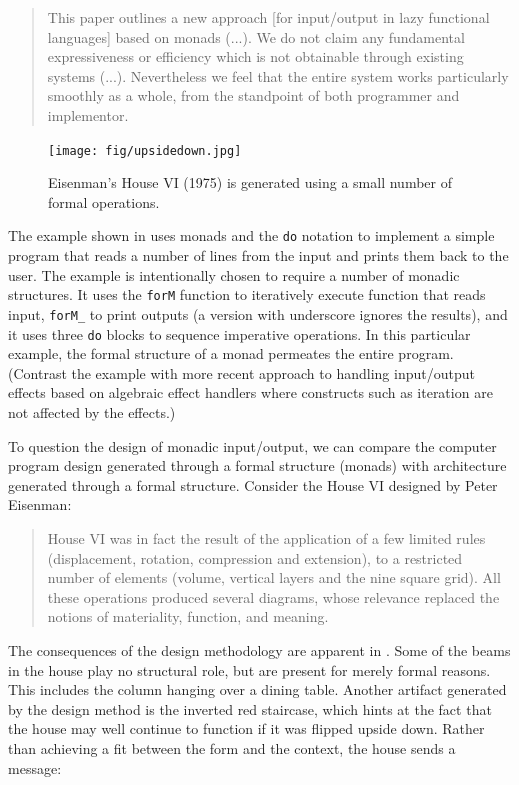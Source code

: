 \begin{quote}
This paper outlines a new approach [for input/output in lazy functional languages]
based on monads (...). We do not claim any fundamental expressiveness or efficiency
which is not obtainable through existing systems (...). Nevertheless we feel
that the entire system works particularly smoothly as a whole, from the standpoint
of both programmer and implementor.
\end{quote}


\begin{figure}
\centering
\vspace{-1em}
\texttt{[image: fig/upsidedown.jpg]}
\caption{Eisenman's House VI (1975) is generated using a small number of formal operations.}
\label{fig:upsidedown}
\end{figure}

The example shown in  uses monads and the \texttt{do} notation to
implement a simple program that reads a number of lines from the input and prints them back
to the user. The example is intentionally chosen to require a number of monadic structures.
It uses the \texttt{forM} function to iteratively execute function that reads input,
\texttt{forM\_} to print outputs (a version with underscore ignores the results),
and it uses three \texttt{do} blocks to sequence imperative operations. In this particular
example, the formal structure of a monad permeates the entire program. (Contrast the example
with more recent approach to handling input/output effects based on algebraic effect handlers
where constructs such as iteration are not affected by the effects.)

To question the design of monadic input/output, we can compare the computer program design
generated through a formal structure (monads) with architecture generated through a formal
structure. Consider the House VI designed by Peter Eisenman:

\begin{quote}
House VI was in fact the result of the application of a few limited rules
(displacement, rotation, compression and extension), to a restricted number of
elements (volume, vertical layers and the nine square grid). All these operations
produced several diagrams, whose relevance replaced the notions of materiality,
function, and meaning.
\end{quote}

The consequences of the design methodology are apparent in .
Some of the beams in the house play no structural role, but are present for merely formal
reasons. This includes the column hanging over a dining table. Another artifact generated
by the design method is the inverted red staircase, which hints at the fact that the house
may well continue to function if it was flipped upside down. Rather than achieving a fit between
the form and the context, the house sends a message:

